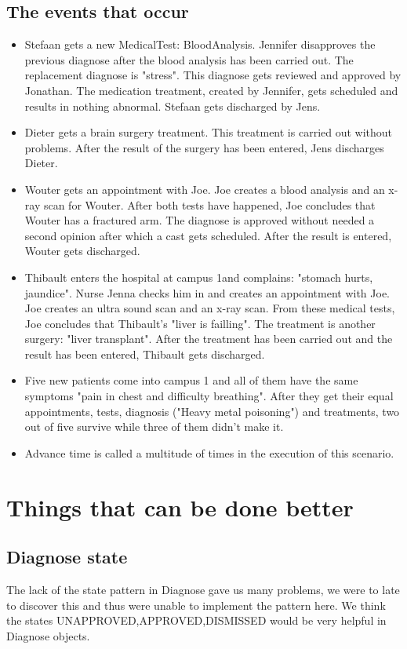 \documentclass[12pt]{article}
\begin{document}
\subsection{The events that occur}
\begin{itemize}
\item{Stefaan gets a new MedicalTest: BloodAnalysis. Jennifer disapproves the previous diagnose after the blood analysis has been carried out. The replacement diagnose is "stress". This diagnose gets reviewed and approved by Jonathan. The medication treatment, created by Jennifer, gets scheduled and results in nothing abnormal. Stefaan gets discharged by Jens.}
\item{Dieter gets a brain surgery treatment. This treatment is carried out without problems. After the result of the surgery has been entered, Jens discharges Dieter.}	
\item{Wouter gets an appointment with Joe. Joe creates a blood analysis and an x-ray scan for Wouter. After both tests have happened, Joe concludes that Wouter has a fractured arm. The diagnose is approved without needed a second opinion after which a cast gets scheduled. After the result is entered, Wouter gets discharged.}
\item{Thibault enters the hospital at campus 1and complains: "stomach hurts, jaundice". Nurse Jenna checks him in and creates an appointment with Joe. Joe creates an ultra sound scan and an x-ray scan. From these medical tests, Joe concludes that Thibault's "liver is failling". The treatment is another surgery: "liver transplant". After the treatment has been carried out and the result has been entered, Thibault gets discharged.}
\item{Five new patients come into campus 1 and all of them have the same symptoms "pain in chest and difficulty breathing". After they get their equal appointments, tests, diagnosis ("Heavy metal poisoning") and treatments, two out of five survive while three of them didn't make it.}
\item{Advance time is called a multitude of times in the execution of this scenario.}
\end{itemize}
\section{Things that can be done better}
\subsection{Diagnose state}
The lack of the state pattern in Diagnose gave us many problems, we were to late to discover this and thus were unable to implement the pattern here. We think the states UNAPPROVED,APPROVED,DISMISSED would be very helpful in Diagnose objects.
\end{document}
